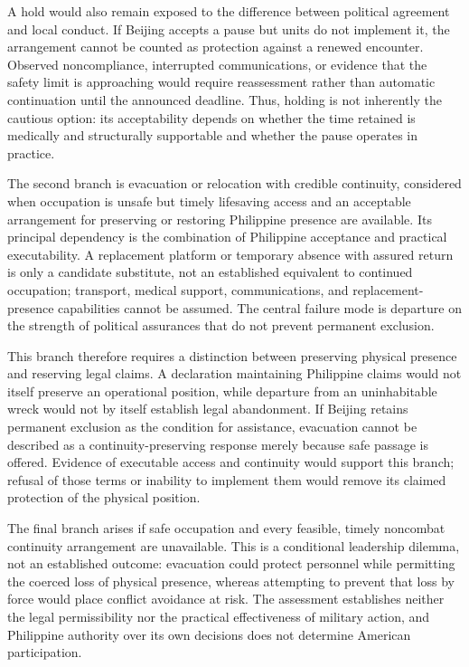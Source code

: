 \documentclass[11pt]{article}
\begin{document}
A hold would also remain exposed to the difference between political agreement and local conduct. If Beijing accepts a pause but units do not implement it, the arrangement cannot be counted as protection against a renewed encounter. Observed noncompliance, interrupted communications, or evidence that the safety limit is approaching would require reassessment rather than automatic continuation until the announced deadline. Thus, holding is not inherently the cautious option: its acceptability depends on whether the time retained is medically and structurally supportable and whether the pause operates in practice.

The second branch is evacuation or relocation with credible continuity, considered when occupation is unsafe but timely lifesaving access and an acceptable arrangement for preserving or restoring Philippine presence are available. Its principal dependency is the combination of Philippine acceptance and practical executability. A replacement platform or temporary absence with assured return is only a candidate substitute, not an established equivalent to continued occupation; transport, medical support, communications, and replacement-presence capabilities cannot be assumed. The central failure mode is departure on the strength of political assurances that do not prevent permanent exclusion.

This branch therefore requires a distinction between preserving physical presence and reserving legal claims. A declaration maintaining Philippine claims would not itself preserve an operational position, while departure from an uninhabitable wreck would not by itself establish legal abandonment. If Beijing retains permanent exclusion as the condition for assistance, evacuation cannot be described as a continuity-preserving response merely because safe passage is offered. Evidence of executable access and continuity would support this branch; refusal of those terms or inability to implement them would remove its claimed protection of the physical position.

The final branch arises if safe occupation and every feasible, timely noncombat continuity arrangement are unavailable. This is a conditional leadership dilemma, not an established outcome: evacuation could protect personnel while permitting the coerced loss of physical presence, whereas attempting to prevent that loss by force would place conflict avoidance at risk. The assessment establishes neither the legal permissibility nor the practical effectiveness of military action, and Philippine authority over its own decisions does not determine American participation.
\end{document}
